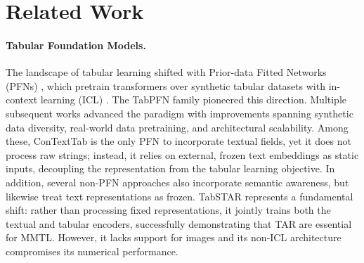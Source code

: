 \documentclass{llmxive}
\begin{document}
\section{Related Work}
\label{sec:related}

\paragraph{Tabular Foundation Models.} The landscape of tabular learning shifted with Prior-data Fitted Networks (PFNs) \cite{muller_transformers_2021}, which pretrain transformers over synthetic tabular datasets with in-context learning (ICL) \cite{brown_language_2020}. The TabPFN family \cite{hollmann_tabpfn_2022, hollmann_accurate_2025, grinsztajn_tabpfn-25_2026, garg_real-tabpfn_2025} pioneered this direction. Multiple subsequent works \cite{qu_tabicl_2025, qu_tabiclv2_2026, ma_tabdpt_2025, zhang_mitra_2025, spinaci_contexttab_2025, zhang_limix_2025, bouadi_orion-msp_2025} advanced the paradigm with improvements spanning synthetic data diversity, real-world data pretraining, and architectural scalability. Among these, ConTextTab \cite{spinaci_contexttab_2025} is the only PFN to incorporate textual fields, yet it does not process raw strings; instead, it relies on external, frozen text embeddings as static inputs, decoupling the representation from the tabular learning objective. In addition, several non-PFN approaches \cite{yan_making_2023, kim_carte_2024, kim_table_2025} also incorporate semantic awareness, but likewise treat text representations as frozen. TabSTAR \cite{arazi_tabstar_2025} represents a fundamental shift: rather than processing fixed representations, it jointly trains both the textual and tabular encoders, successfully demonstrating that TAR are essential for MMTL. However, it lacks support for images and its non-ICL architecture compromises its numerical performance.
\end{document}
